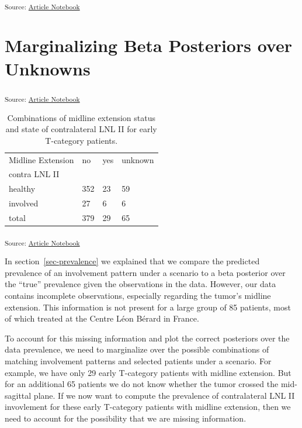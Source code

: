 \documentclass[
  sn-mathphys-num,
]{sn-jnl}
\begin{document}
\textsubscript{Source:
\href{https://rmnldwg.github.io/bilateral-paper/manuscript-preview.html}{Article
Notebook}}

\section{Marginalizing Beta Posteriors over
Unknowns}\label{marginalizing-beta-posteriors-over-unknowns}

\textsubscript{Source:
\href{https://rmnldwg.github.io/bilateral-paper/manuscript-preview.html}{Article
Notebook}}

\begin{longtable}[]{@{}llll@{}}

\caption{\label{tbl-data-unknowns}Combinations of midline extension
status and state of contralateral LNL II for early T-category patients.}

\tabularnewline

\toprule\noalign{}
Midline Extension & no & yes & unknown \\
contra LNL II & & & \\
\midrule\noalign{}
\endhead
\bottomrule\noalign{}
\endlastfoot
healthy & 352 & 23 & 59 \\
involved & 27 & 6 & 6 \\
total & 379 & 29 & 65 \\

\end{longtable}

\textsubscript{Source:
\href{https://rmnldwg.github.io/bilateral-paper/manuscript-preview.html}{Article
Notebook}}

In section~\ref{sec-prevalence} we explained that we compare the
predicted prevalence of an involvement pattern under a scenario to a
beta posterior over the ``true'' prevalence given the observations in
the data. However, our data contains incomplete observations, especially
regarding the tumor's midline extension. This information is not present
for a large group of 85 patients, most of which treated at the Centre
Léon Bérard in France.

To account for this missing information and plot the correct posteriors
over the data prevalence, we need to marginalize over the possible
combinations of matching involvement patterns and selected patients
under a scenario. For example, we have only 29 early T-category patients
with midline extension. But for an additional 65 patients we do not know
whether the tumor crossed the mid-sagittal plane. If we now want to
compute the prevalence of contralateral LNL II invovlement for these
early T-category patients with midline extension, then we need to
account for the possibility that we are missing information.
\end{document}

